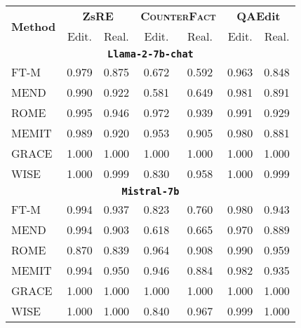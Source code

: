 \begin{table}[t]
    \centering
    \begin{adjustbox}{max width=\linewidth}
    \begin{tabular}{lcc cc cc}
    \toprule
    \multirow{2}{*}{\textbf{Method}} & \multicolumn{2}{c}{\textbf{ZsRE}} & \multicolumn{2}{c}{\textbf{\textsc{CounterFact}}} & \multicolumn{2}{c}{\textbf{QAEdit}} \\
    
     \cmidrule(lr){2-3} \cmidrule(lr){4-6} \cmidrule(lr){6-7} 
     & Edit. & Real.  & Edit. & Real. & Edit.  & Real. \\
     \midrule
     \multicolumn{7}{c}{\texttt{\textbf{Llama-2-7b-chat}}} \\
     \midrule
    FT-M & \num{0.979} & \num{0.875} & \num{0.672} & \num{0.592} & \num{0.963}   & \num{0.848} \\
    MEND & \num{0.990} & \num{0.922} & \num{0.581} & \num{0.649} & \num{0.981}   & \num{0.891} \\
    ROME & \num{0.995} & \num{0.946} & \num{0.972} & \num{0.939} & \num{0.991}   & \num{0.929} \\
    MEMIT & \num{0.989} & \num{0.920} & \num{0.953} & \num{0.905} & \num{0.980}   & \num{0.881} \\
    GRACE & \num{1.000} & \num{1.000} & \num{1.000} & \num{1.000} & \num{1.000}   & \num{1.000} \\
    WISE & \num{1.000} & \num{0.999} & \num{0.830} & \num{0.958} & \num{1.000}   & \num{0.999} \\
    
    \midrule
     
    \multicolumn{7}{c}{\texttt{\textbf{Mistral-7b}}} \\
    \midrule
    FT-M & \num{0.994} & \num{0.937} & \num{0.823} & \num{0.760} & \num{0.980}   & \num{0.943} \\
    MEND & \num{0.994} & \num{0.903} & \num{0.618} & \num{0.665} & \num{0.970}   & \num{0.889} \\
    ROME & \num{0.870} & \num{0.839} & \num{0.964} & \num{0.908} & \num{0.990}   & \num{0.959} \\
    MEMIT & \num{0.994} & \num{0.950} & \num{0.946} & \num{0.884} & \num{0.982}   & \num{0.935} \\
    GRACE & \num{1.000} & \num{1.000} & \num{1.000} & \num{1.000} & \num{1.000}   & \num{1.000} \\
    WISE & \num{1.000} & \num{1.000} & \num{0.840} & \num{0.967} & \num{0.999}   & \num{1.000} \\
    \midrule


\end{tabular}
\end{adjustbox}
\end{table}
